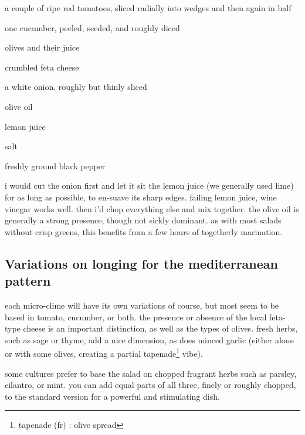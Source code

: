 \begin{ingredients}
  \item a couple of ripe red tomatoes, sliced radially into wedges and
  then again in half

  \item one cucumber, peeled, seeded, and roughly diced

  \item olives and their juice

  \item crumbled feta cheese

  \item \onehalf a white onion, roughly but thinly sliced

  \item olive oil

  \item lemon juice

  \item salt

  \item freshly ground black pepper
\end{ingredients}

i would cut the onion first and let it sit the lemon juice (we generally used 
lime) for as long as possible, to en-suave its sharp edges. failing lemon 
juice, wine vinegar works well. then i'd chop everything else and mix together. 
the olive oil is generally a strong presence, though not sickly dominant. as 
with most salads without crisp greens, this benefits from a few hours of 
togetherly marination.

\subsection{Variations on longing for the mediterranean pattern}

each micro-clime will have its own variations of course, but most seem to be 
based in tomato, cucumber, or both. the presence or absence of the local 
feta-type cheese is an important distinction, as well as the types of olives. 
fresh herbs, such as sage or thyme, add a nice dimension, as does minced garlic 
(either alone or with some olives, creating a partial 
tapenade\footnote{tapenade (fr) : olive spread} vibe).

some cultures prefer to base the salad on chopped fragrant herbs such as 
parsley, cilantro, or mint. you can add equal parts of all three, finely or 
roughly chopped, to the standard version for a powerful and stimulating dish.

